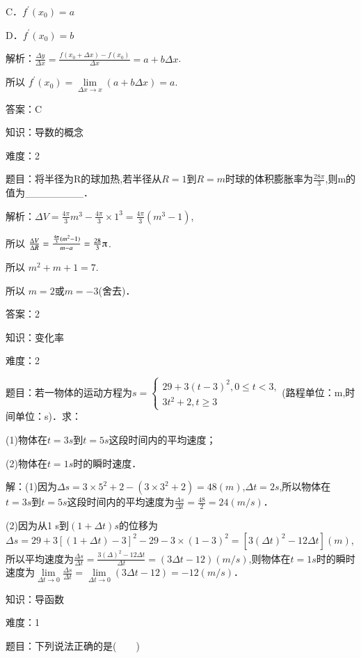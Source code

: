 \documentclass{article} %
\begin{document}
C．$f^{'}(x_{0})=a $

D．$f^{'}(x_{0})=b$

解析：$\frac{\Delta y}{\Delta x}=\frac{f(x_0+\Delta x)-f(x_0)}{\Delta x}=a+b\Delta x$.

所以 $f^{'}(x_{0})=\lim\limits_{\Delta x \rightarrow x} (a+b\Delta x)=a$.

答案：C



知识：导数的概念

难度：2

题目：将半径为R的球加热,若半径从$R=1$到$R=m$时球的体积膨胀率为$\frac{28\pi}{3}$,则m的值为\_\_\_\_\_\_\_\_．

解析：$\Delta V=\frac{4\pi}{3}m^{3}-\frac{4\pi}{3}{\times}1^{3}=\frac{4\pi}{3}(m^{3}-1)$,

所以 $\frac{\Delta V}{\Delta R}=\frac{\frac{4\pi}{3}(m^2-1)}{m-a}=\frac{28}{3}\piup$.

所以 $m^{2}+m+1=7$.

所以 $m=2$或$m=-3$(舍去)．

答案：2



知识：变化率

难度：2

题目：若一物体的运动方程为$
s=
\begin{cases}
29+3{(t-3)}^2,0\le t<3,\\
3t^2+2,t\ge3
\end{cases}$(路程单位：m,时间单位：s)．求：

(1)物体在$t=3s$到$t=5s$这段时间内的平均速度；

(2)物体在$t=1s$时的瞬时速度．

解：(1)因为$\Delta s=3\times5^{2}+2-(3\times3^{2}+2)=48(m)$,$\Delta t=2 s$,所以物体在$t=3 s$到$t=5 s$这段时间内的平均速度为$\frac{\Delta s}{\Delta t}=\frac{48}{2}=24(m/s)$．


(2)因为从1 s到$(1+\Delta t)s$的位移为$\Delta s=29+3[(1+\Delta t)-3]^{2}-29-3{\times}(1-3)^{2}=[3(\Delta t)^{2}-12\Delta t](m)$,所以平均速度为$\frac{\Delta s}{\Delta t}=\frac{3{(\Delta)}^2-12\Delta t}{\Delta t}=(3\Delta t-12)(m/s)$,则物体在$t=1 s$时的瞬时速度为$\lim\limits_{\Delta t\rightarrow 0}\frac{\Delta s}{\Delta t}=\lim\limits_{\Delta t\rightarrow 0} (3\Delta t-12)=-12(m/s)$．

\noindent 

\noindent 知识：导函数

难度：1

题目：下列说法正确的是(　　)
\end{document}
